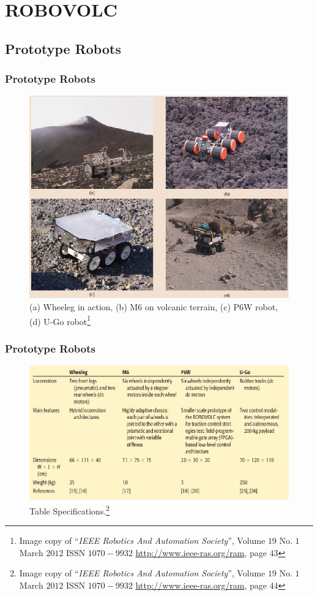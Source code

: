 \documentclass[xcolor=svgnames]{beamer}
\begin{document}
\section{ROBOVOLC}
\subsection{Prototype Robots}
\begin{frame}
\frametitle{Prototype Robots}
    \begin{figure}[H]
	\centering
      \includegraphics[scale=0.31]{7.png}
	\caption{{\scriptsize (a) Wheeleg in action, (b) M6 on volcanic terrain, (c) P6W robot, (d) U-Go robot\footnote{Image copy of ``\textit{IEEE Robotics And Automation Society}'', Volume $19$ No. $1$ March $2012$ ISSN $1070-9932$ \url{http://www.ieee-ras.org/ram}, page $43$}}}
      \label{fig5}
    \end{figure}
\end{frame}

\begin{frame}
  \frametitle{Prototype Robots}
    \begin{figure}[H]
	\centering
      \includegraphics[scale=0.33]{figure.png}
	\caption{Table Specifications.\footnote{Image copy of ``\textit{IEEE Robotics And Automation Society}'', Volume $19$ No. $1$ March $2012$ ISSN $1070-9932$ \url{http://www.ieee-ras.org/ram}, page $44$}}
      \label{fig9}
    \end{figure}
\end{frame}
\end{document}
